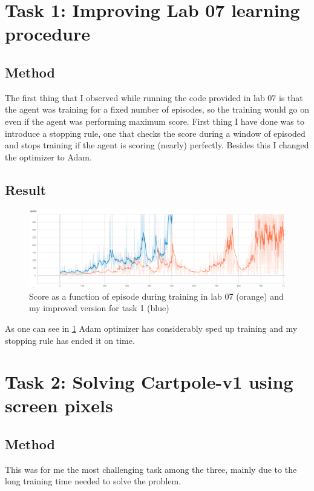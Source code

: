 \documentclass{article}
\begin{document}
\section{Task 1: Improving Lab 07 learning procedure}
\subsection{Method}
The first thing that I observed while running the code provided in lab 07 is that the agent was training for a fixed number of episodes, so the training would go on even if the agent was performing maximum score. First thing I have done was to introduce a stopping rule, one that checks the score during a window of episoded and stops training if the agent is scoring (nearly) perfectly. Besides this I changed the optimizer to Adam. 

\subsection{Result}
\begin{figure}[H]
  \begin{center}
    \includegraphics[width=\linewidth]{imgs/task_1_vs_lab_07.png}
    \caption{Score as a function of episode during training in lab 07 (orange) and my improved version for task 1 (blue)}\label{task_1}
  \end{center}
\end{figure}

As one can see in \figurename{\ref{task_1}} Adam optimizer has considerably sped up training and my stopping rule has ended it on time.

\section{Task 2: Solving Cartpole-v1 using screen pixels}
\subsection{Method}
This was for me the most challenging task among the three, mainly due to the long training time needed to solve the problem.
\end{document}
